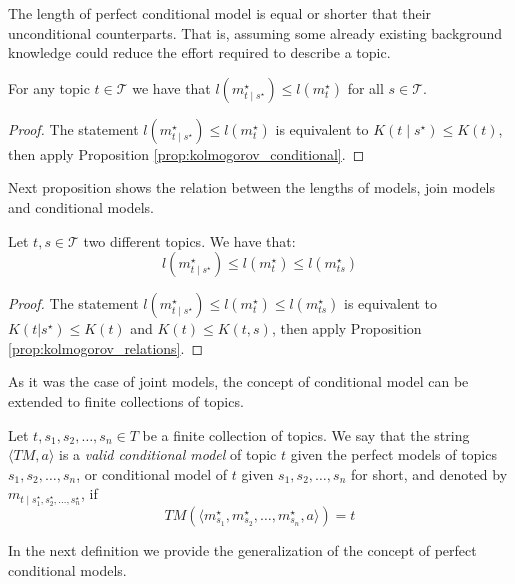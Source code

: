 The length of perfect conditional model is equal or shorter that their unconditional counterparts. That is, assuming some already existing background knowledge could reduce the effort required to describe a topic.

\begin{proposition}
\label{prop:description_conditional_inequality}
For any topic $t \in \mathcal{T}$ we have that $l \left( m_{t \mid s^\star}^{\star} \right) \leq l \left(m^\star_t\right)$ for all $s \in \mathcal{T}$.
\end{proposition}
\begin{proof}
The statement $l \left( m_{t \mid s^\star}^{\star} \right) \leq l \left(m^\star_t\right)$ is equivalent to $K(t \mid s^\star) \leq K(t)$, then apply Proposition \ref{prop:kolmogorov_conditional}.
\end{proof}

Next proposition shows the relation between the lengths of models, join models and conditional models.

\begin{proposition}
\label{prop:description_conditional_joint}
Let $t, s \in \mathcal{T}$ two different topics. We have that:
\[
l \left( m_{t \mid s^\star}^{\star} \right) \leq l \left( m_t^\star \right) \leq l \left( m_{ts}^\star \right)
\]
\end{proposition}
\begin{proof}
The statement $l \left( m_{t \mid s^\star}^{\star} \right) \leq l \left( m_t^\star \right) \leq l \left( m_{ts}^\star \right)$ is equivalent to $K(t | s^\star ) \leq K(t)$ and $K(t) \leq K(t, s)$, then apply Proposition \ref{prop:kolmogorov_relations}.
\end{proof}

As it was the case of joint models, the concept of conditional model can be extended to finite collections of topics.

\begin{definition}
Let $t, s_1, s_2, \ldots, s_n \in T$ be a finite collection of topics. We say that the string $\langle TM,a \rangle$ is a \emph{valid conditional model} of topic $t$ given the perfect models of topics $s_1, s_2, \ldots, s_n$, or conditional model of $t$ given $s_1, s_2, \ldots, s_n$ for short, and denoted by $m_{t \mid s_1^\star, s_2^\star, \ldots, s_n^\star}$, if
\[
TM \left(\langle m_{s_1}^\star, m_{s_2}^\star, \ldots, m_{s_n}^\star, a \rangle \right) = t
\]
\end{definition}

In the next definition we provide the generalization of the concept of perfect conditional models.

